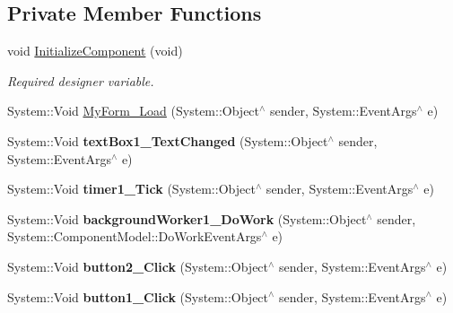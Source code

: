 \subsection*{Private Member Functions}
\begin{DoxyCompactItemize}
\item 
void \hyperlink{class_glasses_1_1_my_form_a53ab94a74403574619ba9f0a116f5c5b}{Initialize\+Component} (void)
\begin{DoxyCompactList}\small\item\em Required designer variable. \end{DoxyCompactList}\item 
System\+::\+Void \hyperlink{class_glasses_1_1_my_form_a9416887089d9934b8f015f3373d85047}{My\+Form\+\_\+\+Load} (System\+::\+Object$^\wedge$ sender, System\+::\+Event\+Args$^\wedge$ e)
\item 
\mbox{\label{class_glasses_1_1_my_form_a3a8627dfdbc36b9ab78456453bb7ef46}} 
System\+::\+Void {\bfseries text\+Box1\+\_\+\+Text\+Changed} (System\+::\+Object$^\wedge$ sender, System\+::\+Event\+Args$^\wedge$ e)
\item 
\mbox{\label{class_glasses_1_1_my_form_a8f719629d9ee75b23a04c39e7600dfbb}} 
System\+::\+Void {\bfseries timer1\+\_\+\+Tick} (System\+::\+Object$^\wedge$ sender, System\+::\+Event\+Args$^\wedge$ e)
\item 
\mbox{\label{class_glasses_1_1_my_form_a0019da65bf9f0520ef12b87362912496}} 
System\+::\+Void {\bfseries background\+Worker1\+\_\+\+Do\+Work} (System\+::\+Object$^\wedge$ sender, System\+::\+Component\+Model\+::\+Do\+Work\+Event\+Args$^\wedge$ e)
\item 
\mbox{\label{class_glasses_1_1_my_form_a49ce2d13fddfbbf45e3359e2ca2e120c}} 
System\+::\+Void {\bfseries button2\+\_\+\+Click} (System\+::\+Object$^\wedge$ sender, System\+::\+Event\+Args$^\wedge$ e)
\item 
\mbox{\label{class_glasses_1_1_my_form_a9c4c3f654d6fc70618c196406b2857bf}} 
System\+::\+Void {\bfseries button1\+\_\+\+Click} (System\+::\+Object$^\wedge$ sender, System\+::\+Event\+Args$^\wedge$ e)
\item 
\mbox{\label{class_glasses_1_1_my_form_ad7a4a5227104b061c7ad410b5b4ff138}} 

\end{DoxyCompactItemize}
